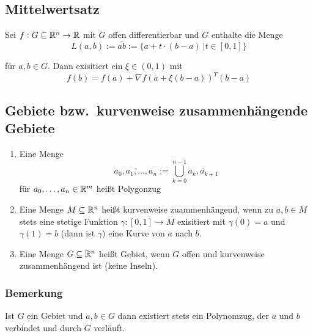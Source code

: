 \subsection{Mittelwertsatz}
Sei $f: G \subseteq \mathbb{R}^n \rightarrow \mathbb{R}$ mit $G$ offen differentierbar und $G$
enthalte die Menge
\begin{equation*}
    L(a, b) :=\overline{ab} := \{ a + t \cdot (b-a)\ \vert t \in [0,1] \}
\end{equation*}

für $a,b \in G$. Dann exisitiert ein $\xi \in (0,1)$ mit
\begin{equation*}
    f(b) = f(a) + {\nabla f(a + \xi (b-a))}^T (b-a)
\end{equation*}

\subsection{Gebiete bzw.\ kurvenweise zusammenhängende Gebiete}
\begin{enumerate}[label= (\alph*)]
    \item Eine Menge
        \begin{equation*}
            \overline{a_0, a_1, \ldots, a_n} := \bigcup_{k=0}^{n-1} \overline{a_k, a_{k+1}}
        \end{equation*}
        für $a_0, \ldots, a_n \in \mathbb{R}^m$ heißt Polygonzug
    \item Eine Menge $M \subseteq \mathbb{R}^n$ heißt kurvenweise zuammenhängend, wenn zu
        $a, b \in M$ stets eine stetige Funktion $\gamma: [0,1] \rightarrow M$
        exisitiert mit $\gamma(0) = a$ und $\gamma(1) = b$ (dann ist $\gamma$)
        eine Kurve von $a$ nach $b$.
    \item Eine Menge $G \subseteq \mathbb{R}^n$ heißt Gebiet, wenn $G$ offen und
        kurvenweise zusammenhängend ist (keine Inseln).
\end{enumerate}

\subsubsection{Bemerkung}
Ist $G$ ein Gebiet und $a, b \in G$ dann existiert stets ein Polynomzug, der $a$
und $b$ verbindet und durch $G$ verläuft.


